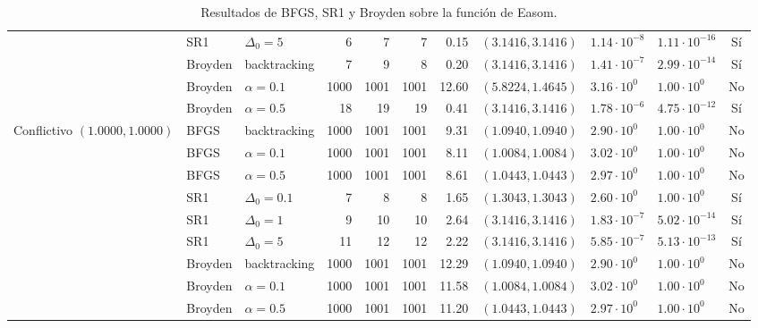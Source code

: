 \begin{table}[htbp]
{\begin{tabular}{lllrrrrlllc}
 & SR1 & $\Delta_0 = 5$ & 6 & 7 & 7 & 0.15 & $(3.1416, 3.1416)$ & $1.14\cdot 10^{-8}$ & $1.11\cdot 10^{-16}$ & Sí \\
 & Broyden & backtracking & 7 & 9 & 8 & 0.20 & $(3.1416, 3.1416)$ & $1.41\cdot 10^{-7}$ & $2.99\cdot 10^{-14}$ & Sí \\
 & Broyden & $\alpha = 0.1$ & 1000 & 1001 & 1001 & 12.60 & $(5.8224, 1.4645)$ & $3.16\cdot 10^{0}$ & $1.00\cdot 10^{0}$ & No \\
 & Broyden & $\alpha = 0.5$ & 18 & 19 & 19 & 0.41 & $(3.1416, 3.1416)$ & $1.78\cdot 10^{-6}$ & $4.75\cdot 10^{-12}$ & Sí \\
\midrule
Conflictivo $(1.0000, 1.0000)$ & BFGS & backtracking & 1000 & 1001 & 1001 & 9.31 & $(1.0940, 1.0940)$ & $2.90\cdot 10^{0}$ & $1.00\cdot 10^{0}$ & No \\
 & BFGS & $\alpha = 0.1$ & 1000 & 1001 & 1001 & 8.11 & $(1.0084, 1.0084)$ & $3.02\cdot 10^{0}$ & $1.00\cdot 10^{0}$ & No \\
 & BFGS & $\alpha = 0.5$ & 1000 & 1001 & 1001 & 8.61 & $(1.0443, 1.0443)$ & $2.97\cdot 10^{0}$ & $1.00\cdot 10^{0}$ & No \\
 & SR1 & $\Delta_0 = 0.1$ & 7 & 8 & 8 & 1.65 & $(1.3043, 1.3043)$ & $2.60\cdot 10^{0}$ & $1.00\cdot 10^{0}$ & Sí \\
 & SR1 & $\Delta_0 = 1$ & 9 & 10 & 10 & 2.64 & $(3.1416, 3.1416)$ & $1.83\cdot 10^{-7}$ & $5.02\cdot 10^{-14}$ & Sí \\
 & SR1 & $\Delta_0 = 5$ & 11 & 12 & 12 & 2.22 & $(3.1416, 3.1416)$ & $5.85\cdot 10^{-7}$ & $5.13\cdot 10^{-13}$ & Sí \\
 & Broyden & backtracking & 1000 & 1001 & 1001 & 12.29 & $(1.0940, 1.0940)$ & $2.90\cdot 10^{0}$ & $1.00\cdot 10^{0}$ & No \\
 & Broyden & $\alpha = 0.1$ & 1000 & 1001 & 1001 & 11.58 & $(1.0084, 1.0084)$ & $3.02\cdot 10^{0}$ & $1.00\cdot 10^{0}$ & No \\
 & Broyden & $\alpha = 0.5$ & 1000 & 1001 & 1001 & 11.20 & $(1.0443, 1.0443)$ & $2.97\cdot 10^{0}$ & $1.00\cdot 10^{0}$ & No \\
\bottomrule
\end{tabular}}
\caption{Resultados de BFGS, SR1 y Broyden sobre la función de Easom.}
\label{tab:f4}
\end{table}